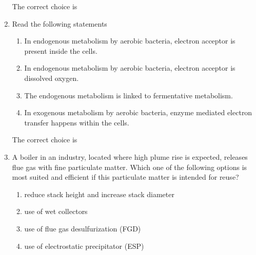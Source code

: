 \documentclass[journal,12pt,onecolumn]{IEEEtran}
\theoremstyle{remark}
\begin{document}
\begin{enumerate}
The correct choice is
\begin{enumerate}
\end{enumerate}
\hfill{}
\item Read the following statements
\begin{enumerate}[label=\roman*)]
\item In endogenous metabolism by aerobic bacteria, electron acceptor is present inside the cells.
\item In endogenous metabolism by aerobic bacteria, electron acceptor is dissolved oxygen.
\item The endogenous metabolism is linked to fermentative metabolism.
\item In exogenous metabolism by aerobic bacteria, enzyme mediated electron transfer happens within the cells.
\end{enumerate}

The correct choice is
\begin{enumerate}
\end{enumerate}
\hfill{}

\item A boiler in an industry, located where high plume rise is expected, releases flue gas with fine particulate matter. Which one of the following options is most suited and efficient if this particulate matter is intended for reuse?
\begin{enumerate}
\item reduce stack height and increase stack diameter
\item use of wet collectors
\item use of flue gas desulfurization (FGD)
\item use of electrostatic precipitator (ESP)
\end{enumerate}
\hfill{}


\end{enumerate}
\end{document}
